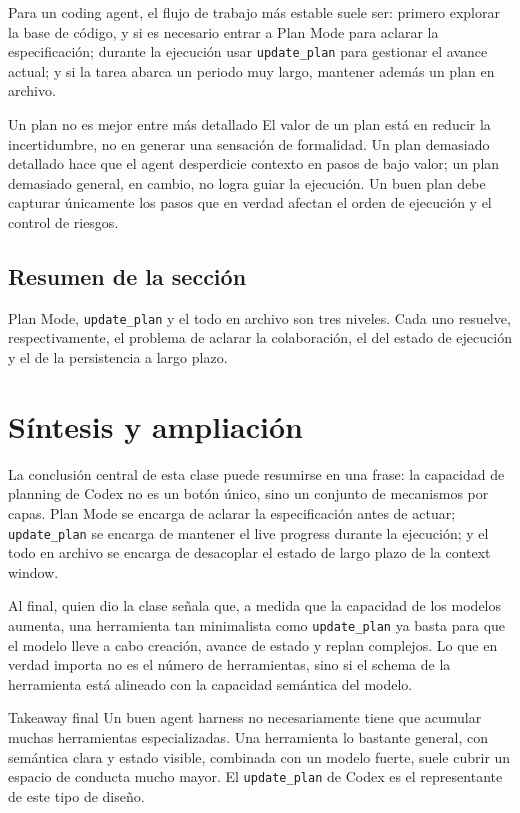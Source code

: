 \documentclass[a4paper]{article}
\begin{document}
Para un coding agent, el flujo de trabajo más estable suele ser: primero explorar la base de código, y si es necesario entrar a Plan Mode para aclarar la especificación; durante la ejecución usar \texttt{update\_plan} para gestionar el avance actual; y si la tarea abarca un periodo muy largo, mantener además un plan en archivo.

\begin{warningbox}{Un plan no es mejor entre más detallado}
El valor de un plan está en reducir la incertidumbre, no en generar una sensación de formalidad. Un plan demasiado detallado hace que el agent desperdicie contexto en pasos de bajo valor; un plan demasiado general, en cambio, no logra guiar la ejecución. Un buen plan debe capturar únicamente los pasos que en verdad afectan el orden de ejecución y el control de riesgos.
\end{warningbox}

\subsection{Resumen de la sección}

Plan Mode, \texttt{update\_plan} y el todo en archivo son tres niveles. Cada uno resuelve, respectivamente, el problema de aclarar la colaboración, el del estado de ejecución y el de la persistencia a largo plazo.

\section{Síntesis y ampliación}

La conclusión central de esta clase puede resumirse en una frase: la capacidad de planning de Codex no es un botón único, sino un conjunto de mecanismos por capas. Plan Mode se encarga de aclarar la especificación antes de actuar; \texttt{update\_plan} se encarga de mantener el live progress durante la ejecución; y el todo en archivo se encarga de desacoplar el estado de largo plazo de la context window.

Al final, quien dio la clase señala que, a medida que la capacidad de los modelos aumenta, una herramienta tan minimalista como \texttt{update\_plan} ya basta para que el modelo lleve a cabo creación, avance de estado y replan complejos. Lo que en verdad importa no es el número de herramientas, sino si el schema de la herramienta está alineado con la capacidad semántica del modelo.

\begin{importantbox}{Takeaway final}
Un buen agent harness no necesariamente tiene que acumular muchas herramientas especializadas. Una herramienta lo bastante general, con semántica clara y estado visible, combinada con un modelo fuerte, suele cubrir un espacio de conducta mucho mayor. El \texttt{update\_plan} de Codex es el representante de este tipo de diseño.
\end{importantbox}
\end{document}
